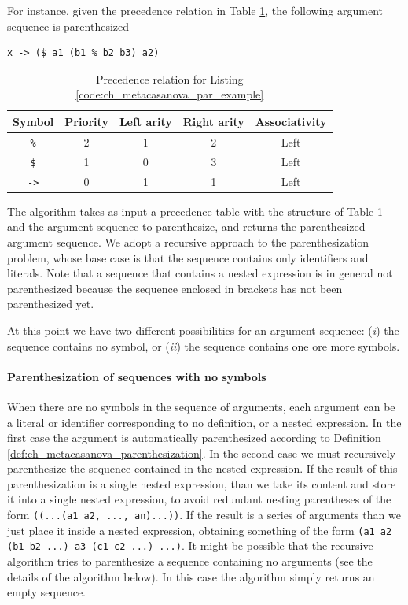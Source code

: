 \noindent
For instance, given the precedence relation in Table \ref{tab:ch_metacasanova_example_precedence_relation}, the following argument sequence is parenthesized

\begin{lstlisting}[label = code:ch_metacasanova_par_example,caption = Example of parenthesization]
x -> ($ a1 (b1 % b2 b3) a2)
\end{lstlisting}

\begin{table}
	\begin{tabular}{|c|c|c|c|c|}
		\hline
		\textbf{Symbol} & \textbf{Priority} & \textbf{Left arity} & \textbf{Right arity} & \textbf{Associativity} \\
		\hline
		\texttt{\%} & 2 & 1 & 2 & Left \\
		\hline
		\texttt{\$} & 1 & 0 & 3 & Left \\
		\hline
		\texttt{->} & 0 & 1 & 1 & Left \\
		\hline
	\end{tabular}
	\caption{Precedence relation for Listing \ref{code:ch_metacasanova_par_example}}
	\label{tab:ch_metacasanova_example_precedence_relation}
\end{table}

The algorithm takes as input a precedence table with the structure of Table \ref{tab:ch_metacasanova_example_precedence_relation} and the argument sequence to parenthesize, and returns the parenthesized argument sequence. We adopt a recursive approach to the parenthesization problem, whose base case is that the sequence contains only identifiers and literals. Note that a sequence that contains a nested expression is in general not parenthesized because the sequence enclosed in brackets has not been parenthesized yet.

At this point we have two different possibilities for an argument sequence: (\textit{i}) the sequence contains no symbol, or (\textit{ii}) the sequence contains one ore more symbols.

\paragraph{Parenthesization of sequences with no symbols}
When there are no symbols in the sequence of arguments, each argument can be a literal or identifier corresponding to no definition, or a nested expression. In the first case the argument is automatically parenthesized according to Definition \ref{def:ch_metacasanova_parenthesization}. In the second case we must recursively parenthesize the sequence contained in the nested expression. If the result of this parenthesization is a single nested expression, than we take its content and store it into a single nested expression, to avoid redundant nesting parentheses of the form \texttt{((...(a1 a2, ..., an)...))}. If the result is a series of arguments than we just place it inside a nested expression, obtaining something of the form \texttt{(a1 a2 (b1 b2 ...) a3 (c1 c2 ...) ...)}. It might be possible that the recursive algorithm tries to parenthesize a sequence containing no arguments (see the details of the algorithm below). In this case the algorithm simply returns an empty sequence.

